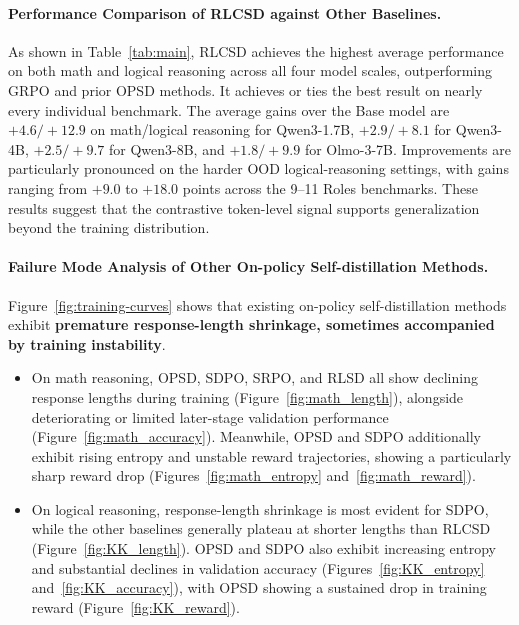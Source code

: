 \paragraph{Performance Comparison of RLCSD against Other Baselines.}
As shown in Table~\ref{tab:main}, RLCSD achieves the highest average performance on both math and logical reasoning across all four model scales, outperforming GRPO and prior OPSD methods. It achieves or ties the best result on nearly every individual benchmark. The average gains over the Base model are $+4.6/+12.9$ on math/logical reasoning for Qwen3-1.7B, $+2.9/+8.1$ for Qwen3-4B, $+2.5/+9.7$ for Qwen3-8B, and $+1.8/+9.9$ for Olmo-3-7B. Improvements are particularly pronounced on the harder OOD logical-reasoning settings, with gains ranging from $+9.0$ to $+18.0$ points across the 9--11 Roles benchmarks. These results suggest that the contrastive token-level signal supports generalization beyond the training distribution.

\paragraph{Failure Mode Analysis of Other On-policy Self-distillation Methods.}
Figure~\ref{fig:training-curves} shows that existing on-policy self-distillation methods exhibit \textbf{premature response-length shrinkage, sometimes accompanied by training instability}. 

\begin{itemize}
    \item On math reasoning, OPSD, SDPO, SRPO, and RLSD all show declining response lengths during training (Figure~\ref{fig:math_length}), alongside deteriorating or limited later-stage validation performance (Figure~\ref{fig:math_accuracy}). Meanwhile, OPSD and SDPO additionally exhibit rising entropy and unstable reward trajectories, showing a particularly sharp reward drop (Figures~\ref{fig:math_entropy} and~\ref{fig:math_reward}).
    \item On logical reasoning, response-length shrinkage is most evident for SDPO, while the other baselines generally plateau at shorter lengths than RLCSD (Figure~\ref{fig:KK_length}). OPSD and SDPO also exhibit increasing entropy and substantial declines in validation accuracy (Figures~\ref{fig:KK_entropy} and~\ref{fig:KK_accuracy}), with OPSD showing a sustained drop in training reward (Figure~\ref{fig:KK_reward}). 
\end{itemize}

